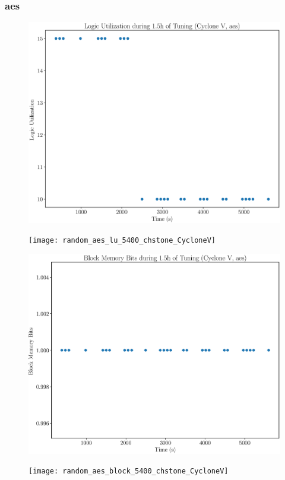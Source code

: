 \documentclass[12pt, a4paper]{article}
\begin{document}
\newpage

\subsubsection{aes}

\begin{figure}[htpb]
    \centering
    \noindent
    \begin{minipage}{.48\textwidth}
        \centering
        \includegraphics[scale=.25]{aes_lu_5400_chstone_CycloneV}
    \end{minipage}%
    \hfill
    \begin{minipage}{.48\textwidth}
        \centering
        \texttt{[image: random\_aes\_lu\_5400\_chstone\_CycloneV]}
    \end{minipage}%

    \begin{minipage}{.48\textwidth}
        \includegraphics[scale=.25]{aes_block_5400_chstone_CycloneV}
    \end{minipage}%
    \hfill
    \begin{minipage}{.48\textwidth}
        \texttt{[image: random\_aes\_block\_5400\_chstone\_CycloneV]}
    \end{minipage}%


\end{figure}
\end{document}
